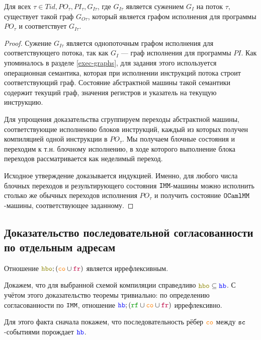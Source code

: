 \begin{lemma} \label{corresponding-existence-single}
  Для всех $\tau\in Tid, PO_\tau, PI_\tau, G_{I\tau}$, где $G_{I\tau}$ является сужением $G_I$ на поток $\tau$, существует такой граф $G_{O\tau}$, который является графом исполнения для программы $PO_\tau$ и соответствует $G_{I\tau}$. 
\end{lemma}
\begin{proof}
  Сужение $G_{I\tau}$ является однопоточным графом исполнения для соответствующего потока, так как $G_{I}$ --- граф исполнения для программы $PI$. Как упоминалось в разделе \ref{exec-graphs}, для задания этого используется операционная семантика, которая при исполнении инструкций потока строит соответствующий граф. Состояние абстрактной машины такой семантики содержит текущий граф, значения регистров и указатель на текущую инструкцию. 

  Для упрощения доказательства сгруппируем переходы абстрактной машины, соответствующие исполнению блоков инструкций, каждый из которых получен компиляцией одной инструкции в $PO_\tau$. Мы получаем блочные состояния и  переходим к т.н.  блочному исполнению, в ходе которого выполнение блока переходов рассматривается как неделимый переход.

  Исходное утверждение доказывается индукцией. Именно, для любого числа блочных переходов и результирующего состояния $\mathtt{IMM}$-машины можно исполнить столько же обычных переходов исполнения $PO_\tau$ и получить состояние $\mathtt{OCaml}\allowbreak \mathtt{MM}$-машины, соответствующее заданному.
\end{proof}


\subsection{Доказательство последовательной согласованности по отдельным адресам}
\label{corr-coherence}

\begin{theorem} \label{corr-coherence-thm}
  Отношение $\lHBO ; (\lCO\cup \lFR)$ является иррефлексивным. 
\end{theorem}
Докажем, что для выбранной схемой компиляции справедливо $\lHBO \subseteq \lHB$. С учётом этого доказательство теоремы тривиально: по определению согласованности по $\mathtt{IMM}$, отношение $\lHB ; (\lRF \cup \lCO \cup \lFR)$ иррефлексивно. 

Для этого факта сначала покажем, что последовательность рёбер $\lCO$ между ${\mathtt{sc}}$-событиями порождает $\lHB$.

